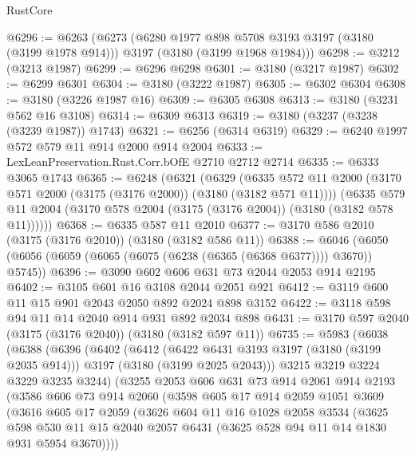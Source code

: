 \begin{lexlean}{RustCore}
\begin{coremodule}
@6296 := @6263
    (@6273
      (@6280 @1977 @898 @5708 @3193 @3197 (@3180 (@3199 @1978 @914)))
      @3197
      (@3180 (@3199 @1968 @1984)))
@6298 := @3212 (@3213 @1987)
@6299 := @6296 @6298
@6301 := @3180 (@3217 @1987)
@6302 := @6299 @6301
@6304 := @3180 (@3222 @1987)
@6305 := @6302 @6304
@6308 := @3180 (@3226 @1987 @16)
@6309 := @6305 @6308
@6313 := @3180 (@3231 @562 @16 @3108)
@6314 := @6309 @6313
@6319 := @3180 (@3237 (@3238 (@3239 @1987)) @1743)
@6321 := @6256 (@6314 @6319)
@6329 := @6240 @1997 @572 @579 @11 @914 @2000 @914 @2004
@6333 := LexLeanPreservation.Rust.Corr.bOfE @2710 @2712 @2714
@6335 := @6333 @3065 @1743
@6365 := @6248
    (@6321
      (@6329
        (@6335 @572 @11 @2000 (@3170 @571 @2000 (@3175 (@3176 @2000)) (@3180 (@3182 @571 @11))))
        (@6335 @579 @11 @2004 (@3170 @578 @2004 (@3175 (@3176 @2004)) (@3180 (@3182 @578 @11))))))
@6368 := @6335 @587 @11 @2010
@6377 := @3170 @586 @2010 (@3175 (@3176 @2010)) (@3180 (@3182 @586 @11))
@6388 := @6046 (@6050 (@6056 (@6059 (@6065 (@6075 (@6238 (@6365 (@6368 @6377)))) @3670)) @5745))
@6396 := @3090 @602 @606 @631 @73 @2044 @2053 @914 @2195
@6402 := @3105 @601 @16 @3108 @2044 @2051 @921
@6412 := @3119 @600 @11 @15 @901 @2043 @2050 @892 @2024 @898 @3152
@6422 := @3118 @598 @94 @11 @14 @2040 @914 @931 @892 @2034 @898
@6431 := @3170 @597 @2040 (@3175 (@3176 @2040)) (@3180 (@3182 @597 @11))
@6735 := @5983
    (@6038
      (@6388
        (@6396
          (@6402
            (@6412
              (@6422 @6431 @3193 @3197 (@3180 (@3199 @2035 @914)))
              @3197
              (@3180 (@3199 @2025 @2043)))
            @3215
            @3219
            @3224
            @3229
            @3235
            @3244)
          (@3255
            @2053
            @606
            @631
            @73
            @914
            @2061
            @914
            @2193
            (@3586
              @606
              @73
              @914
              @2060
              (@3598
                @605
                @17
                @914
                @2059
                @1051
                @3609
                (@3616
                  @605
                  @17
                  @2059
                  (@3626
                    @604
                    @11
                    @16
                    @1028
                    @2058
                    @3534
                    (@3625
                      @598
                      @530
                      @11
                      @15
                      @2040
                      @2057
                      @6431
                      (@3625 @528 @94 @11 @14 @1830 @931 @5954 @3670))))

\end{coremodule}
\end{lexlean}
